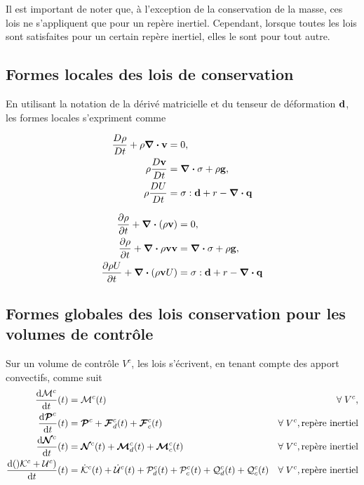 \documentclass[a4paper,11pt]{report}
\newcommand{\dvm}[2]{\frac{D #1}{D #2}}
\begin{document}
      Il est important de noter que, à l'exception de la conservation de la masse, ces lois ne s'appliquent que pour un repère inertiel. Cependant, lorsque toutes les lois sont satisfaites pour un certain repère inertiel, elles le sont pour tout autre.

    \subsection{Formes locales des lois de conservation}
      En utilisant la notation de la dérivé matricielle et du tenseur de déformation $\vb{d}$, les formes locales s'expriment comme
      \begin{multicols}{2}
        \begin{align}
          \dvm{\rho}{t} + \rho \div \vb{v} &= 0, \nonumber\\
          \rho \dvm{\vb{v}}{t} &= \div \sigma + \rho \vb{g},\nonumber\\
          \rho \dvm{U}{t} &= \vb{\sigma} : \vb{d} + r - \div \vb{q} \nonumber
        \end{align}

        \begin{align}
          \pdv{\rho}{t} + \div (\rho \vb{v}) &= 0, \nonumber \\
          \pdv{\rho}{t} + \div {\rho \vb{v} \vb{v}} &= \div \vb{\sigma} + \rho \vb{g}, \\
          \pdv{\rho U}{t} + \div (\rho \vb{v} U) &= \vb{\sigma} : \vb{d} + r - \div \vb{q} \nonumber
        \end{align}

      \end{multicols}

    \subsection{Formes globales des lois conservation pour les volumes de contrôle}
      Sur un volume de contrôle $V^c$, les lois s'écrivent, en tenant compte des apport convectifs, comme suit
      \begin{align}
        \dv{\mathcal{M}^c}{t} {} (t) &= \mathcal{M}^c(t) & \forall \; V^c, \nonumber\\
        \dv{\boldsymbol{\mathcal{P}}^c}{t} {} (t) &= \boldsymbol{\mathcal{P}}^c + \boldsymbol{\mathcal{F}}^c_d(t) + \boldsymbol{\mathcal{F}}^c_c(t) & \forall \; V^c, \textrm{repère inertiel} \\
        \dv{\boldsymbol{\mathcal{N}}^c}{t} {} (t) &= \boldsymbol{\mathcal{N}}^c(t) + \boldsymbol{\mathcal{M}}^c_d(t) + \boldsymbol{\mathcal{M}}^c_c(t) & \forall \; V^c, \textrm{repère inertiel} \nonumber\\
        \dv{()\mathcal{K}^c + \mathcal{U}^c)}{t} {}(t) &= \dot{\mathcal{K}}^c (t) + \dot{\mathcal{U}}^c(t) + \mathcal{P}^c_d(t) + \mathcal{P}^c_c(t) + \mathcal{Q}^c_d (t) + \mathcal{Q}^c_c (t) &  \forall \; V^c, \textrm{repère inertiel} \nonumber
      \end{align}
\end{document}
